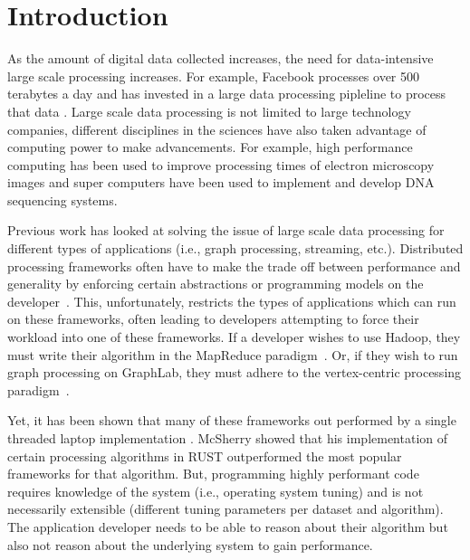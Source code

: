 \section{Introduction} 
\label{sec:intro}
As the amount of digital data collected increases, the need for data-intensive
large scale processing increases. For example, Facebook processes over 500
terabytes a day and has invested in a large data processing pipleline to process
that data 
. 
Large scale data processing is not limited to large technology companies,
different disciplines in the sciences have also taken advantage of computing
power to make advancements. For example, high performance computing has been
used to improve processing times of electron microscopy images and super
computers have been used to implement and develop DNA sequencing systems.

Previous work has looked at solving the issue of large scale data processing for
different types of applications (i.e., graph processing, streaming, etc.).
Distributed processing frameworks often have to make the trade off between
performance and generality by enforcing certain abstractions or programming
models on the developer~\cite{Dean2004,Low2010,Murray2013}. 
This, unfortunately, restricts the types of applications which can run on these
frameworks, often leading to developers attempting to force their workload into
one of these frameworks. If a developer wishes to use Hadoop, they must write
their algorithm in the MapReduce paradigm~\cite{Dean2004}. Or, if they wish to
run graph processing on GraphLab, they must adhere to the vertex-centric
processing paradigm~\cite{Low2010}.

Yet, it has been shown that many of these frameworks out performed by a single
threaded laptop implementation . McSherry showed that his
implementation of certain processing algorithms in RUST outperformed the most
popular frameworks for that algorithm. But, programming highly performant code
requires knowledge of the system (i.e., operating system tuning) and is not
necessarily extensible  (different tuning parameters per dataset and algorithm).
The application developer needs to be able to reason about their algorithm but
also not reason about the underlying system to gain performance. 

